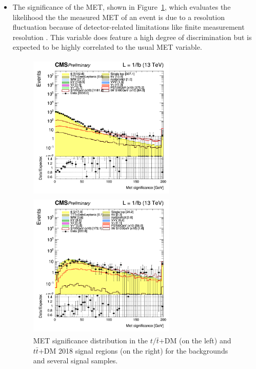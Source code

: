 \documentclass[a4paper, 10pt, openright]{report}
\begin{document}
\begin{itemize}
\item The significance of the \ac{MET}, shown in Figure~\ref{fig:SRdiscMETsign}, which evaluates the likelihood the the measured \ac{MET} of an event is due to a resolution fluctuation because of detector-related limitations like finite measurement resolution \cite{METsign}. This variable does feature a high degree of discrimination but is expected to be highly correlated to the usual \ac{MET} variable.

\begin{figure}[htbp]
\centering
\begin{minipage}[b]{.48\textwidth}
\includegraphics[width=7cm, height=7cm]{figs/log_cratio_topCR_ll_2j_signal1_MET_significance.png}
\end{minipage}\hfill
\begin{minipage}[b]{.48\textwidth}
\includegraphics[width=7cm, height=7cm]{figs/log_cratio_topCR_ll_2j_signal0_MET_significance.png}
\end{minipage} \hfill
\caption{\ac{MET} significance distribution in the $t/ \bar t$+DM (on the left) and $t \bar t$+DM 2018 signal regions (on the right) for the backgrounds and several signal samples.}
\label{fig:SRdiscMETsign}
\end{figure}


\end{itemize}
\end{document}
